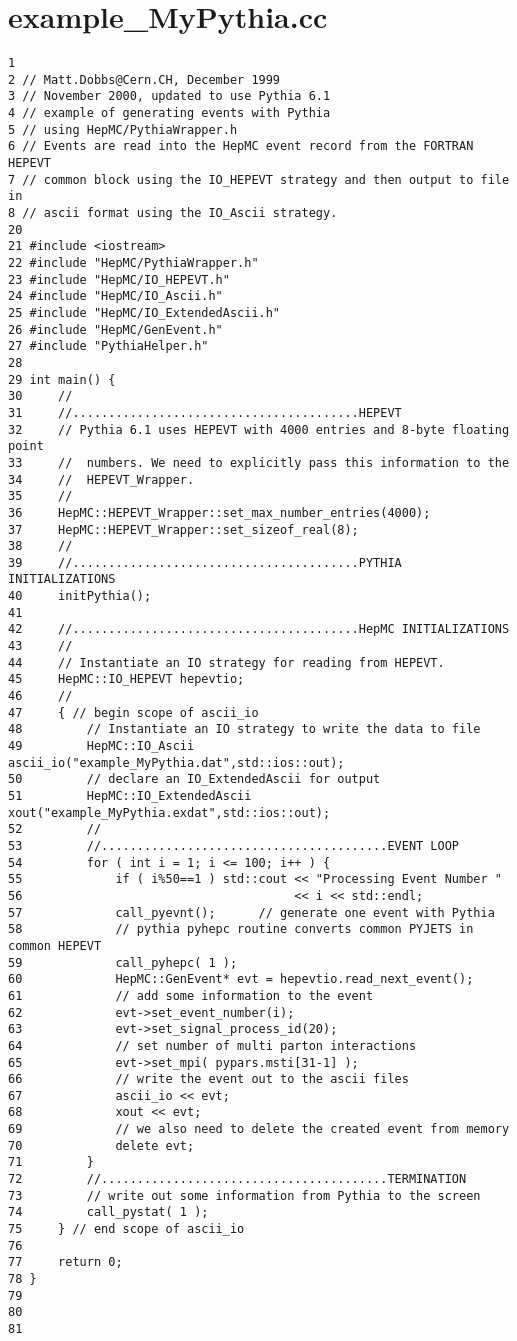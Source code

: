 \section{example\_\-My\-Pythia.cc}


\begin{DocInclude}\begin{verbatim}1 
2 // Matt.Dobbs@Cern.CH, December 1999
3 // November 2000, updated to use Pythia 6.1
4 // example of generating events with Pythia
5 // using HepMC/PythiaWrapper.h 
6 // Events are read into the HepMC event record from the FORTRAN HEPEVT 
7 // common block using the IO_HEPEVT strategy and then output to file in
8 // ascii format using the IO_Ascii strategy.
20 
21 #include <iostream>
22 #include "HepMC/PythiaWrapper.h"
23 #include "HepMC/IO_HEPEVT.h"
24 #include "HepMC/IO_Ascii.h"
25 #include "HepMC/IO_ExtendedAscii.h"
26 #include "HepMC/GenEvent.h"
27 #include "PythiaHelper.h"
28 
29 int main() { 
30     //
31     //........................................HEPEVT
32     // Pythia 6.1 uses HEPEVT with 4000 entries and 8-byte floating point
33     //  numbers. We need to explicitly pass this information to the 
34     //  HEPEVT_Wrapper.
35     //
36     HepMC::HEPEVT_Wrapper::set_max_number_entries(4000);
37     HepMC::HEPEVT_Wrapper::set_sizeof_real(8);
38     //
39     //........................................PYTHIA INITIALIZATIONS
40     initPythia();
41 
42     //........................................HepMC INITIALIZATIONS
43     //
44     // Instantiate an IO strategy for reading from HEPEVT.
45     HepMC::IO_HEPEVT hepevtio;
46     //
47     { // begin scope of ascii_io
48         // Instantiate an IO strategy to write the data to file 
49         HepMC::IO_Ascii ascii_io("example_MyPythia.dat",std::ios::out);
50         // declare an IO_ExtendedAscii for output
51         HepMC::IO_ExtendedAscii xout("example_MyPythia.exdat",std::ios::out);
52         //
53         //........................................EVENT LOOP
54         for ( int i = 1; i <= 100; i++ ) {
55             if ( i%50==1 ) std::cout << "Processing Event Number " 
56                                      << i << std::endl;
57             call_pyevnt();      // generate one event with Pythia
58             // pythia pyhepc routine converts common PYJETS in common HEPEVT
59             call_pyhepc( 1 );
60             HepMC::GenEvent* evt = hepevtio.read_next_event();
61             // add some information to the event
62             evt->set_event_number(i);
63             evt->set_signal_process_id(20);
64             // set number of multi parton interactions
65             evt->set_mpi( pypars.msti[31-1] );
66             // write the event out to the ascii files
67             ascii_io << evt;
68             xout << evt;
69             // we also need to delete the created event from memory
70             delete evt;
71         }
72         //........................................TERMINATION
73         // write out some information from Pythia to the screen
74         call_pystat( 1 );    
75     } // end scope of ascii_io
76 
77     return 0;
78 }
79 
80 
81  
\end{verbatim}
\end{DocInclude}
 